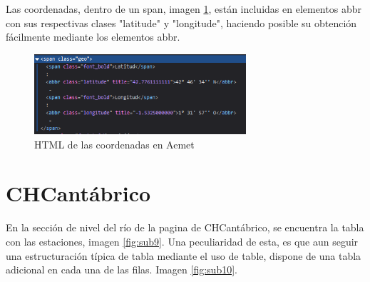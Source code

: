 Las coordenadas, dentro de un span, imagen \ref{fig:ej21}, están incluidas en elementos abbr con sus respectivas clases "latitude" y "longitude", haciendo posible su obtención fácilmente mediante los elementos abbr.

\begin{figure} [H]
	\centering
	\includegraphics[width=0.7\textwidth]{fig/AemetCoordHTML.png}
	\caption[HTML de las coordenadas de Aemet de la estación en Aranguren (Navarra)]{HTML de las coordenadas en Aemet}
	\label{fig:ej21}
\end{figure}

\section{CHCantábrico}
En la sección de nivel del río de la pagina de CHCantábrico, se encuentra la tabla con las estaciones, imagen \ref{fig:sub9}. Una peculiaridad de esta, es que aun seguir una estructuración típica de tabla mediante el uso de table, dispone de una tabla adicional en cada una de las filas. Imagen \ref{fig:sub10}.

